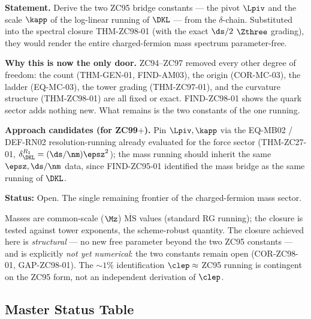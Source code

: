 \documentclass[12pt, a4paper]{article}
\begin{document}
\begin{openqbox}[title={GAP-ZC98-01: Pin the Two ZC95 Constants
  (Priority 1 --- the single remaining door)}]
\textbf{Statement.} Derive the two ZC95 bridge constants --- the pivot $\Lpiv$
and the scale $\kapp$ of the log-linear running of $\DKL$ --- from the
$\delta$-chain. Substituted into the spectral closure THM-ZC98-01 (with the
exact $\ds/2$ $\Zthree$ grading), they would render the entire charged-fermion
mass spectrum parameter-free.

\textbf{Why this is now the only door.} ZC94--ZC97 removed every other degree of
freedom: the count (THM-GEN-01, FIND-AM03), the origin (COR-MC-03), the ladder
(EQ-MC-03), the tower grading (THM-ZC97-01), and the curvature structure
(THM-ZC98-01) are all fixed or exact. FIND-ZC98-01 shows the quark sector adds
nothing new. What remains is the two constants of the one running.

\textbf{Approach candidates (for ZC99$+$).} Pin $\Lpiv,\kapp$ via the EQ-MB02 /
DEF-RN02 resolution-running already evaluated for the force sector
(THM-ZC27-01, $\delta_{\DKL}^{R_1}=(\ds/\nm)\epsz^2$); the mass running should
inherit the same $\epsz,\ds/\nm$ data, since FIND-ZC95-01 identified the mass
bridge as the same running of $\DKL$.

\textbf{Status:} Open. The single remaining frontier of the charged-fermion mass
sector.
\end{openqbox}

\begin{openqbox}[title={OBS-ZC98-01: Provenance and the Structural/Numerical
  Distinction}]
Masses are common-scale ($\Mz$) $\overline{\mathrm{MS}}$ values (standard RG
running); the closure is tested against tower exponents, the scheme-robust
quantity. The closure achieved here is \emph{structural} --- no new free
parameter beyond the two ZC95 constants --- and is explicitly \emph{not yet
numerical}: the two constants remain open (COR-ZC98-01, GAP-ZC98-01). The
$\sim1\%$ identification $\clep\approx$ ZC95 running is contingent on the ZC95
form, not an independent derivation of $\clep$.
\end{openqbox}

\subsection{Master Status Table}
\end{document}
